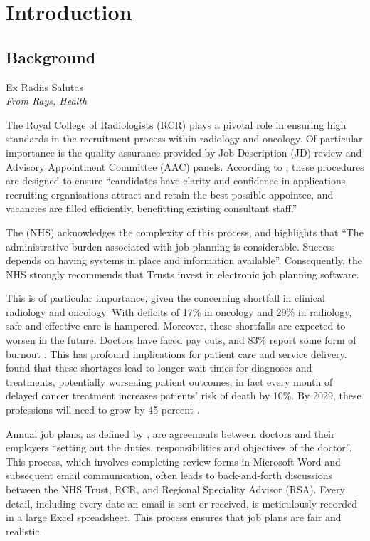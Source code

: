 \chapter{Introduction}
\section{Background} \label{Background}
\epigraph{Ex Radiis Salutas\\\textit{From Rays, Health}}{}
The Royal College of Radiologists (RCR) plays a pivotal role in ensuring high standards in the recruitment process within radiology and oncology. Of particular importance is the quality assurance provided by Job Description (JD) review and Advisory Appointment Committee (AAC) panels. According to \textcite{the_royal_college_of_radiologists_clinical_2022}, these procedures are designed to ensure “candidates have clarity and confidence in applications, recruiting organisations attract and retain the best possible appointee, and vacancies are filled efficiently, benefitting existing consultant staff.” 

The \textcite{national_health_service_consultant_2017} (NHS) acknowledges the complexity of this process, and highlights that “The administrative burden associated with job planning is considerable. Success depends on having systems in place and information available”. Consequently, the NHS strongly recommends that Trusts invest in electronic job planning software.

This is of particular importance, given the concerning shortfall in clinical radiology and oncology. With deficits of 17\% in oncology and 29\% in radiology, safe and effective care is hampered. Moreover, these shortfalls are expected to worsen in the future. Doctors have faced pay cuts, and 83\% report some form of burnout \parencite{the_royal_college_of_radiologists_rcr_2023}. This has profound implications for patient care and service delivery. \textcite{limb_shortages_2022} found that these shortages lead to longer wait times for diagnoses and treatments, potentially worsening patient outcomes, in fact every month of delayed cancer treatment increases patients’ risk of death by 10\%. By 2029, these professions will need to grow by 45 percent \parencite{national_health_service_strategic_2018}.

Annual job plans, as defined by \textcite{the_royal_college_of_radiologists_clinical_2022}, are agreements between doctors and their employers “setting out the duties, responsibilities and objectives of the doctor”. This process, which involves completing review forms in Microsoft Word and subsequent email communication, often leads to back-and-forth discussions between the NHS Trust, RCR, and Regional Speciality Advisor (RSA). Every detail, including every date an email is sent or received, is meticulously recorded in a large Excel spreadsheet. This process ensures that job plans are fair and realistic.

